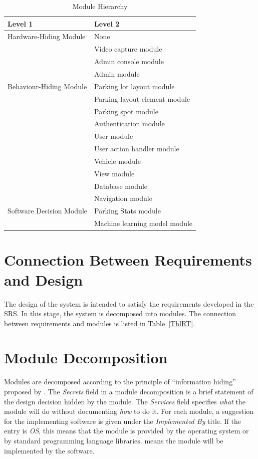 \documentclass[12pt, titlepage]{article}
\begin{document}
\color{black}
\begin{table}[h!]
\centering
\begin{tabular}{p{} p{}}
\toprule
\textbf{Level 1} & \textbf{Level 2}\\
\midrule

{Hardware-Hiding Module} & None \\
\midrule

\multirow{7}{0.3\textwidth}{Behaviour-Hiding Module} 
& Video capture module\\
& Admin console module\\
& Admin module\\
& Parking lot layout module\\
& Parking layout element module\\
& Parking spot module\\
& Authentication module\\
& User module\\
& User action handler module\\
& Vehicle module\\
& View module\\
& \color{red} {Database module}\\
\midrule

\multirow{3}{0.3\textwidth}{Software Decision Module} & Navigation module\\
& Parking Stats module\\
& Machine learning model module\\
\bottomrule

\end{tabular}
\caption{Module Hierarchy}
\label{TblMH}
\end{table}

\section{Connection Between Requirements and Design} \label{SecConnection}

The design of the system is intended to satisfy the requirements developed in
the SRS. In this stage, the system is decomposed into modules. The connection
between requirements and modules is listed in Table~\ref{TblRT}.

\section{Module Decomposition} \label{SecMD}

Modules are decomposed according to the principle of ``information hiding''
proposed by \citet{ParnasEtAl1984}. The \emph{Secrets} field in a module
decomposition is a brief statement of the design decision hidden by the module.
The \emph{Services} field specifies \emph{what} the module will do without
documenting \emph{how} to do it. For each module, a suggestion for the
implementing software is given under the \emph{Implemented By} title. If the
entry is \emph{OS}, this means that the module is provided by the operating
system or by standard programming language libraries.  \emph{\progname{}} means
the module will be implemented by the \progname{} software.
\end{document}
